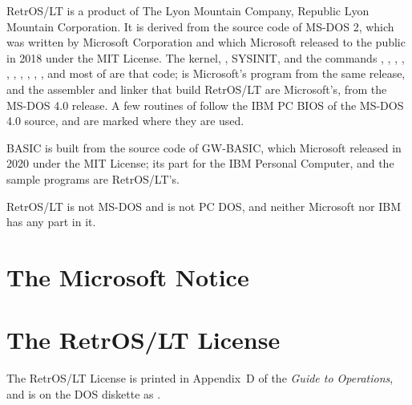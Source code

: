 RetrOS/LT is a product of The Lyon Mountain Company, Republic Lyon
Mountain Corporation. It is derived from the source code of MS-DOS 2,
which was written by Microsoft Corporation and which Microsoft released to
the public in 2018 under the MIT License. The kernel, ,
SYSINIT, and the commands , , ,
, , , , ,
, ,  and most of  are
that code;  is Microsoft's program from the same release, and
the assembler and linker that build RetrOS/LT are Microsoft's, from the
MS-DOS 4.0 release. A few routines of  follow the IBM PC
BIOS of the MS-DOS 4.0 source, and are marked where they are used.

BASIC is built from the source code of GW-BASIC, which Microsoft released
in 2020 under the MIT License; its part for the IBM Personal Computer,
 and the sample programs are RetrOS/LT's.

RetrOS/LT is not MS-DOS and is not PC DOS, and neither Microsoft nor IBM
has any part in it.

\section{The Microsoft Notice}


\section{The RetrOS/LT License}

The RetrOS/LT License is printed in Appendix~D of the \textit{Guide to
Operations}, and is on the DOS diskette as .
